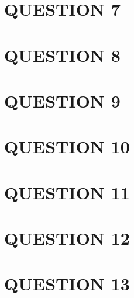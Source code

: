 \documentclass[a4paper]{article}
\begin{document}
\section{QUESTION 7}
\section{QUESTION 8}
\section{QUESTION 9}
\section{QUESTION 10}
\section{QUESTION 11}
\section{QUESTION 12}
\section{QUESTION 13}
\end{document}
